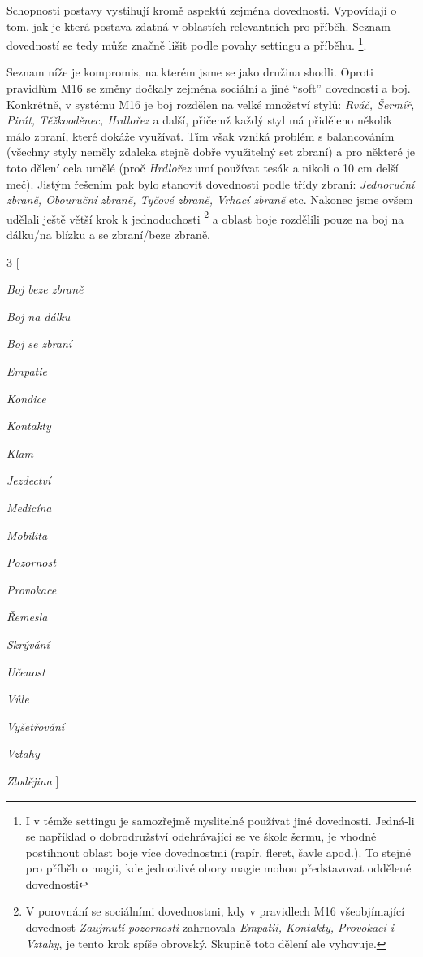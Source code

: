 \documentclass[../main.tex]{subfiles}
\begin{document}
Schopnosti postavy vystihují kromě aspektů zejména dovednosti. Vypovídají o tom, jak je která postava zdatná v oblastích relevantních pro příběh. Seznam dovedností se tedy může značně lišit podle povahy settingu a příběhu. \footnote{I v témže settingu je samozřejmě myslitelné používat jiné dovednosti. Jedná-li se například o dobrodružství odehrávající se ve škole šermu, je vhodné postihnout oblast boje více dovednostmi (rapír, fleret, šavle apod.). To stejné pro příběh o magii, kde jednotlivé obory magie mohou představovat oddělené dovednosti}.

Seznam níže je kompromis, na kterém jsme se jako družina shodli. Oproti pravidlům M16 se změny dočkaly zejména sociální a jiné ``soft'' dovednosti a boj. Konkrétně, v systému M16 je boj rozdělen na velké množství stylů: \textit{Rváč, Šermíř, Pirát, Těžkooděnec, Hrdlořez} a další, přičemž každý styl má přiděleno několik málo zbraní, které dokáže využívat. Tím však vzniká problém s balancováním (všechny styly neměly zdaleka stejně dobře využitelný set zbraní) a pro některé je toto dělení cela umělé (proč \textit{Hrdlořez} umí používat tesák a nikoli o 10 cm delší meč). Jistým řešením pak bylo stanovit dovednosti podle třídy zbraní: \textit{Jednoruční zbraně, Obouruční zbraně, Tyčové zbraně, Vrhací zbraně} etc. Nakonec jsme ovšem udělali ještě větší krok k jednoduchosti \footnote{V porovnání se sociálními dovednostmi, kdy v pravidlech M16 všeobjímající dovednost \textit{Zaujmutí pozornosti} zahrnovala \textit{Empatii, Kontakty, Provokaci i Vztahy}, je tento krok spíše obrovský. Skupině toto dělení ale vyhovuje.} a oblast boje rozdělili pouze na boj na dálku/na blízku a se zbraní/beze zbraně.

\begin{itemize}
\begin{multicols}{3}
[
\item \textit{Boj beze zbraně}
\item \textit{Boj na dálku}
\item \textit{Boj se zbraní}
\item \textit{Empatie}
\item \textit{Kondice}
\item \textit{Kontakty}
\item \textit{Klam}
\item \textit{Jezdectví}
\item \textit{Medicína}
\item \textit{Mobilita}
\item \textit{Pozornost}
\item \textit{Provokace}
\item \textit{Řemesla}
\item \textit{Skrývání}
\item \textit{Učenost}
\item \textit{Vůle}
\item \textit{Vyšetřování}
\item \textit{Vztahy}
\item \textit{Zlodějina}
]
\end{multicols}
\end{itemize}
\end{document}

